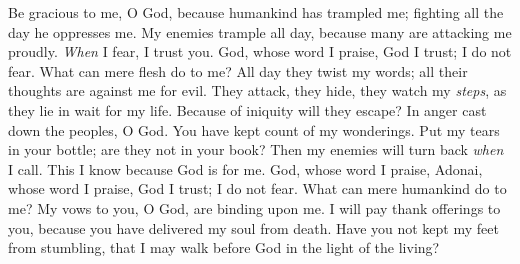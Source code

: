 \begin{biblechapter} %
 Be gracious to me, O God, because humankind has trampled me; 
fighting all the day he oppresses me.
\verse My enemies trample all day, 
because many are attacking me proudly.
\verse \textit{When} I fear, I trust you.
\verse God, whose word I praise, 
God I trust; I do not fear. 
What can mere flesh do to me?
\verse All day they twist my words; 
all their thoughts are against me for evil.
\verse They attack, they hide, they watch my \textit{steps}, 
as they lie in wait for my life.
\verse Because of iniquity will they escape? 
In anger cast down the peoples, O God.
\verse You have kept count of my wonderings. 
Put my tears in your bottle; 
are they not in your book?
\verse Then my enemies will turn back \textit{when} I call. 
This I know because God is for me.
\verse God, whose word I praise, 
Adonai, whose word I praise,
\verse God I trust; I do not fear. 
What can mere humankind do to me?
\verse My vows to you, O God, are binding upon me. 
I will pay thank offerings to you,
\verse because you have delivered my soul from death. 
Have you not kept my feet from stumbling, 
that I may walk before God 
in the light of the living?
\end{biblechapter}

